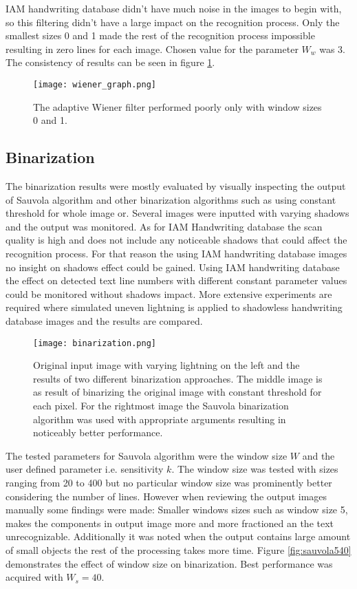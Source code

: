 \documentclass{article}
\begin{document}
    IAM handwriting database didn't have much noise in the images to begin with, so this filtering didn't have a large impact on the recognition process. Only the smallest sizes 0 and 1 made the rest of the recognition process impossible resulting in zero lines for each image. Chosen value for the parameter $W_w$ was 3. The consistency of results can be seen in figure \ref{fig:wienertest}.

    \begin{figure}[!ht]
      \centering
      \texttt{[image: wiener\_graph.png]}
      \caption{The adaptive Wiener filter performed poorly only with window sizes 0 and 1.
      \label{fig:wienertest}}
    \end{figure}

  \subsection{Binarization}
    The binarization results were mostly evaluated by visually inspecting the output of Sauvola algorithm and other binarization algorithms such as using constant threshold for whole image or. Several images were inputted with varying shadows and the output was monitored. As for IAM Handwriting database the scan quality is high and does not include any noticeable shadows that could affect the recognition process. For that reason the using IAM handwriting database images no insight on shadows effect could be gained. Using IAM handwriting database the effect on detected text line numbers with different constant parameter values could be monitored without shadows impact. More extensive experiments are required where simulated uneven lightning is applied to shadowless handwriting database images and the results are compared.

    \begin{figure}[!ht]
      \centering
      \texttt{[image: binarization.png]}
      \caption{Original input image with varying lightning on the left and the results of two different binarization approaches. The middle image is as result of binarizing the original image with constant threshold for each pixel. For the rightmost image the Sauvola binarization algorithm was used with appropriate arguments resulting in noticeably better performance. \label{fig:binarization}}
    \end{figure}


    The tested parameters for Sauvola algorithm were the window size $W$ and the user defined parameter i.e. sensitivity $k$. The window size was tested with sizes ranging from 20 to 400 but no particular window size was prominently better considering the number of lines. However when reviewing the output images manually some findings were made: Smaller windows sizes such as window size 5, makes the components in output image more and more fractioned an the text unrecognizable. Additionally it was noted when the output contains large amount of small objects the rest of the processing takes more time. Figure \ref{fig:sauvola540} demonstrates the effect of window size on binarization. Best performance was acquired with $W_s = 40$.
\end{document}
